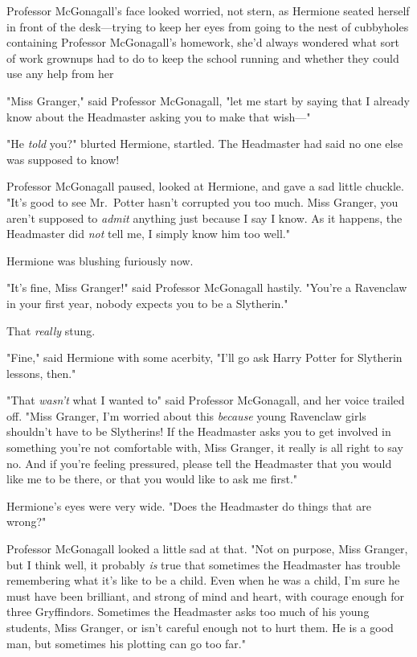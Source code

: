 Professor McGonagall's face looked worried, not stern, as Hermione seated
herself in front of the desk—trying to keep her eyes from going to the nest
of cubbyholes containing Professor McGonagall's homework, she'd always wondered
what sort of work grownups had to do to keep the school running and whether
they could use any help from her{\el}

"Miss Granger," said Professor McGonagall, "let me start by saying that I
already know about the Headmaster asking you to make that wish—"

"He \emph{told} you?" blurted Hermione, startled. The Headmaster had said
no one else was supposed to know!

Professor McGonagall paused, looked at Hermione, and gave a sad little chuckle.
"It's good to see Mr.~Potter hasn't corrupted you too much. Miss Granger, you
aren't supposed to \emph{admit} anything just because I say I know. As it
happens, the Headmaster did \emph{not} tell me, I simply know him too well."

Hermione was blushing furiously now.

"It's fine, Miss Granger!" said Professor McGonagall hastily. "You're a
Ravenclaw in your first year, nobody expects you to be a Slytherin."

That \emph{really} stung.

"Fine," said Hermione with some acerbity, "I'll go ask Harry Potter for
Slytherin lessons, then."

"That \emph{wasn't} what I wanted to{\el}" said Professor McGonagall, and
her voice trailed off. "Miss Granger, I'm worried about this \emph{because}
young Ravenclaw girls shouldn't have to be Slytherins! If the Headmaster asks
you to get involved in something you're not comfortable with, Miss Granger, it
really is all right to say no. And if you're feeling pressured, please tell the
Headmaster that you would like me to be there, or that you would like to ask me
first."

Hermione's eyes were very wide. "Does the Headmaster do things that are wrong?"

Professor McGonagall looked a little sad at that. "Not on purpose, Miss
Granger, but I think{\el} well, it probably \emph{is} true that sometimes
the Headmaster has trouble remembering what it's like to be a child. Even when
he was a child, I'm sure he must have been brilliant, and strong of mind and
heart, with courage enough for three Gryffindors. Sometimes the Headmaster asks
too much of his young students, Miss Granger, or isn't careful enough not to
hurt them. He is a good man, but sometimes his plotting can go too far."

